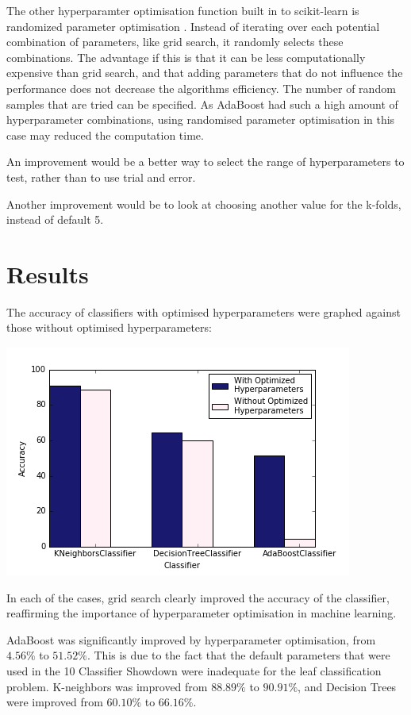 \documentclass{article}
\begin{document}
	The other hyperparamter optimisation function built in to  scikit-learn is randomized parameter optimisation \cite{gridsearch}. Instead of iterating over each potential combination of parameters, like grid search, it randomly selects these combinations. The advantage if this is that it can be less computationally expensive than grid search, and that adding parameters that do not influence the performance does not decrease the algorithms efficiency. The number of random samples that are tried can be specified.  As AdaBoost had such a high amount of hyperparameter combinations, using randomised parameter optimisation in this case may reduced the computation time. 

	An improvement would be a better way to select the range of hyperparameters to test, rather than to use trial and error.

	Another improvement would be to look at choosing another value for the k-folds, instead of default 5. 

\newpage
\section{Results}

The accuracy of classifiers with optimised hyperparameters were graphed against those without optimised hyperparameters:

\includegraphics[scale=0.7]{acc_class}

In each of the cases, grid search clearly improved the accuracy of the classifier, reaffirming the importance of hyperparameter optimisation in machine learning. 

AdaBoost was significantly improved by hyperparameter optimisation, from $4.56\%$ to $51.52\%$. This is due to the fact that the default parameters that were used in the 10 Classifier Showdown \cite{showdown} were inadequate for the leaf classification problem. K-neighbors was improved from $88.89\%$ to $90.91\%$, and Decision Trees were improved from $60.10\%$ to $66.16\%$. 
\end{document}
